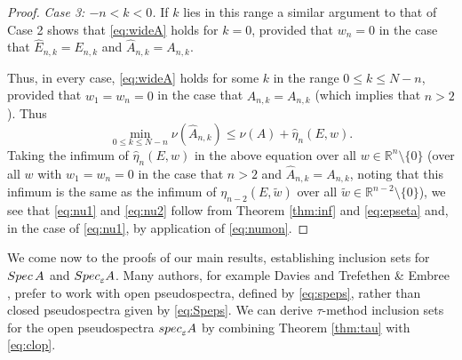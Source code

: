 \documentclass[preprint,1p,11pt]{elsarticle}
\newcommand\R{{\mathbb R}}
\newcommand\eps{{\varepsilon}}
\newcommand\Spec{{\rm Spec}\,}  %
\newcommand\speps{{\rm spec}_\eps}
\newcommand\Speps{{\rm Spec}_\eps}
\numberwithin{equation}{section}   %
\numberwithin{figure}{section}  %
\begin{document}
\begin{proof}
{\em Case 3: $-n<k<0$.} If $k$ lies in this range a similar argument to that of Case 2 shows %
 that   \eqref{eq:wideA} holds for $k=0$, provided that $w_n=0$  in the case that $\widehat E_{n,k}=E_{n,k}$ and $\widehat A_{n,k}=A_{n,k}$.

Thus, in every case, \eqref{eq:wideA} holds for some $k$ in the range $0\leq k\leq N-n$, provided that $w_1=w_n=0$  in the case that $\widehat A_{n,k}=A_{n,k}$ (which implies that $n>2$). Thus
$$
\min_{0\leq k\leq N-n} \nu(\widehat A_{n,k})\leq \nu(A)+\hat \eta_n(E,w). 
$$
 Taking the infimum of $\hat \eta_n(E,w)$ in the above equation over all $w\in \R^n\setminus\{0\}$ (over all $w$ with $w_1=w_n=0$ in the case that $n>2$ and  $\widehat A_{n,k}=A_{n,k}$, noting that this infimum is the same as the infimum of $\eta_{n-2}(E,\tilde w)$ over all $\tilde w\in \R^{n-2}\setminus\{0\}$), we see that \eqref{eq:nu1} and \eqref{eq:nu2} follow from  Theorem \ref{thm:inf} and \eqref{eq:epseta} and, in the case of \eqref{eq:nu1}, by application of \eqref{eq:numon}.
\end{proof}

We come now to the proofs of our main results, establishing inclusion sets for $\Spec A$ and $\Speps A$. Many authors, for example Davies \cite{Davies2007:Book} and Trefethen \& Embree \cite{TrefEmbBook}, prefer to work with open pseudospectra, defined by \eqref{eq:speps}, rather than closed pseudospectra given by \eqref{eq:Speps}. We can derive $\tau$-method inclusion sets for the open pseudospectra $\speps A$ by combining  Theorem  \ref{thm:tau} with \eqref{eq:clop}. 
\end{document}
